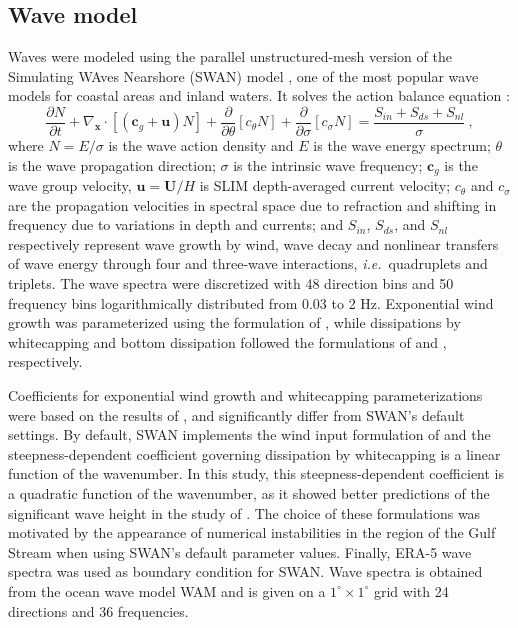 \documentclass[preprint,12pt,authoryear]{elsarticle}
\newcommand{\ie}{{\it i.e.}\ }
\begin{document}
\subsection{Wave model}
Waves were modeled using the parallel unstructured-mesh version of the Simulating WAves Nearshore (SWAN) model \citep{booij1999third}, one of the most popular wave models for coastal areas and inland waters. It solves the action balance equation \citep{mei1989applied}:
\begin{equation}
    \dfrac{\partial N}{\partial t} + \nabla_\mathbf{x}\cdot[(\mathbf{c}_g+\mathbf{u})N] + \dfrac{\partial }{\partial \theta}[c_\theta N] + \dfrac{\partial}{\partial \sigma}[c_\sigma N] = \dfrac{S_{in}+S_{ds}+S_{nl}}{\sigma}~, \label{eq:swan}
\end{equation}
where $N=E/\sigma$ is the wave action density and $E$ is the wave energy spectrum; $\theta$ is the wave propagation direction; $\sigma$ is the intrinsic wave frequency; $\mathbf{c}_g$ is the wave group velocity, $\mathbf{u}=\mathbf{U}/H$ is SLIM depth-averaged current velocity; $c_\theta$ and $c_\sigma$ are the propagation velocities in spectral space due to refraction and shifting in frequency due to variations in depth and currents; and $S_{in}$, $S_{ds}$, and $S_{nl}$ respectively represent wave growth by wind, wave decay and nonlinear transfers of wave energy through four and three-wave interactions, \ie quadruplets and triplets. The wave spectra were discretized with 48 direction bins and 50 frequency bins logarithmically distributed from 0.03 to 2 Hz. Exponential wind growth was parameterized using the formulation of \cite{janssen1991quasi}, while dissipations by whitecapping and bottom dissipation followed the formulations of \cite{komen1984existence} and \cite{madsen1989spectral}, respectively.

Coefficients for exponential wind growth and whitecapping parameterizations were based on the results of \cite{siadatmousavi2011evaluation}, and significantly differ from SWAN's default settings. By default, SWAN implements the wind input formulation of \cite{komen1984existence} and the steepness-dependent coefficient governing dissipation by whitecapping is a linear function of the wavenumber. In this study, this steepness-dependent coefficient is a quadratic function of the wavenumber, as it showed better predictions of the significant wave height in the study of \cite{siadatmousavi2011evaluation}. The choice of these formulations was motivated by the appearance of numerical instabilities in the region of the Gulf Stream when using SWAN's default parameter values. Finally, ERA-5 wave spectra was used as boundary condition for SWAN. Wave spectra is obtained from the ocean wave model WAM and is given on a $1^\circ \times 1^\circ$ grid with 24 directions and 36 frequencies.
\end{document}
